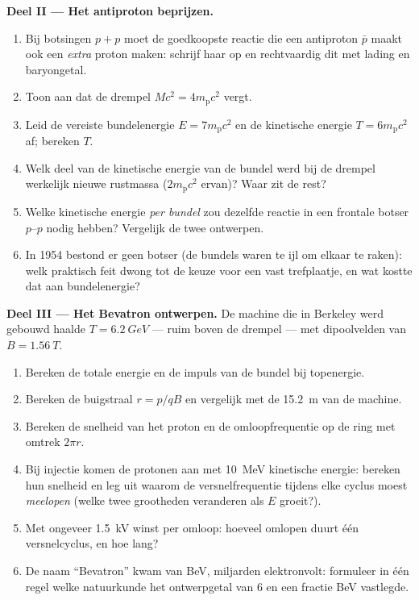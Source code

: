 \begin{problem}
\medskip\noindent\textbf{Deel II --- Het antiproton beprijzen.}
\begin{enumerate}[resume]
  \item Bij botsingen $p + p$ moet de goedkoopste reactie die een
        antiproton $\bar p$ maakt ook een \emph{extra} proton maken:
        schrijf haar op en rechtvaardig dit met lading en baryongetal.
  \item Toon aan dat de drempel $Mc^2 = 4m_{\text{p}}c^2$ vergt.
  \item Leid de vereiste bundelenergie $E = 7m_{\text{p}}c^2$ en de
        kinetische energie $T = 6m_{\text{p}}c^2$ af; bereken $T$.
  \item Welk deel van de kinetische energie van de bundel werd bij de
        drempel werkelijk nieuwe rustmassa ($2m_{\text{p}}c^2$ ervan)?
        Waar zit de rest?
  \item Welke kinetische energie \emph{per bundel} zou dezelfde reactie
        in een frontale botser $p$--$p$ nodig hebben? Vergelijk de twee
        ontwerpen.
  \item In 1954 bestond er geen botser (de bundels waren te ijl om
        elkaar te raken): welk praktisch feit dwong tot de keuze voor
        een vast trefplaatje, en wat kostte dat aan bundelenergie?
\end{enumerate}

\medskip\noindent\textbf{Deel III --- Het Bevatron ontwerpen.}
De machine die in Berkeley werd gebouwd haalde $T = \qty{6.2}{GeV}$ ---
ruim boven de drempel --- met dipoolvelden van $B =
\qty{1.56}{T}$.
\begin{enumerate}[resume]
  \item Bereken de totale energie en de impuls van de bundel bij
        topenergie.
  \item Bereken de buigstraal $r = p/qB$ en vergelijk met de
        \qty{15.2}{m} van de machine.
  \item Bereken de snelheid van het proton en de omloopfrequentie op de
        ring met omtrek $2\pi r$.
  \item Bij injectie komen de protonen aan met \qty{10}{MeV} kinetische
        energie: bereken hun snelheid en leg uit waarom de
        versnelfrequentie tijdens elke cyclus moest \emph{meelopen}
        (welke twee grootheden veranderen als $E$ groeit?).
  \item Met ongeveer \qty{1.5}{kV} winst per omloop: hoeveel omlopen
        duurt één versnelcyclus, en hoe lang?
  \item De naam ``Bevatron'' kwam van BeV, miljarden elektronvolt:
        formuleer in één regel welke natuurkunde het ontwerpgetal van
        $6$ en een fractie BeV vastlegde.
\end{enumerate}


\end{problem}
